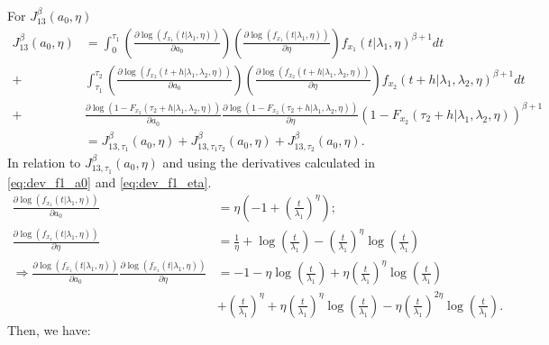 \documentclass{article}
\begin{document}
For $J_{13}^{\beta}(a_0,\eta)$
\begin{align*}
J_{13}^{\beta}(a_0,\eta)&=\int_{0}^{\tau_1}\left(\frac{\partial \log(f_{x_1}(t|\lambda_1,\eta))}{\partial a_0}\right)\left(\frac{\partial \log(f_{x_1}(t|\lambda_1,\eta))}{\partial \eta}\right)f_{x_1}(t|\lambda_1,\eta)^{\beta+1}dt
\\
+&\int_{\tau_1}^{\tau_2}\left(\frac{\partial \log(f_{x_2}(t+h|\lambda_1,\lambda_2,\eta))}{\partial a_0}\right)\left(\frac{\partial \log(f_{x_2}(t+h|\lambda_1,\lambda_2,\eta))}{\partial \eta}\right)f_{x_2}(t+h|\lambda_1,\lambda_2,\eta)^{\beta+1}dt
\\
+&\frac{\partial \log\left(1-F_{x_2}(\tau_2+h|\lambda_1,\lambda_2,\eta)\right)}{\partial a_0}\frac{\partial \log\left(1-F_{x_2}(\tau_2+h|\lambda_1,\lambda_2,\eta)\right)}{\partial \eta}\left(1-F_{x_2}(\tau_2+h|\lambda_1,\lambda_2,\eta)\right)^{\beta+1}
\\
&=J_{13,\tau_1}^{\beta}(a_0,\eta)+J_{13,\tau_1\tau_2}^{\beta}(a_0,\eta)+J_{13,\tau_2}^{\beta}(a_0,\eta).
\end{align*}
In relation to  $J_{13,\tau_1}^{\beta}(a_0,\eta)$ and using the derivatives calculated in \eqref{eq:dev_f1_a0} and \eqref{eq:dev_f1_eta}.
\begin{align*}
\frac{\partial \log(f_{x_1}(t|\lambda_1,\eta))}{\partial a_0}&=\eta\left(-1+\left(\frac{t}{\lambda_1}\right)^{\eta}\right);
 \\
 \frac{\partial \log(f_{x_1}(t|\lambda_1,\eta))}{\partial \eta}&=\frac{1}{\eta}+\log\left(\frac{t}{\lambda_1}\right)-\left(\frac{t}{\lambda_1}\right)^{\eta}\log\left(\frac{t}{\lambda_1}\right)
 \\
 \Rightarrow \frac{\partial \log(f_{x_1}(t|\lambda_1,\eta))}{\partial a_0} \frac{\partial \log(f_{x_1}(t|\lambda_1,\eta))}{\partial \eta}&=-1-\eta\log\left(\frac{t}{\lambda_1}\right)+\eta\left(\frac{t}{\lambda_1}\right)^{\eta}\log\left(\frac{t}{\lambda_1}\right)
  \\
  &+\left(\frac{t}{\lambda_1}\right)^{\eta}+\eta\left(\frac{t}{\lambda_1}\right)^{\eta}\log\left(\frac{t}{\lambda_1}\right)-\eta\left(\frac{t}{\lambda_1}\right)^{2\eta}\log\left(\frac{t}{\lambda_1}\right).
\end{align*}
Then, we have:
\end{document}
